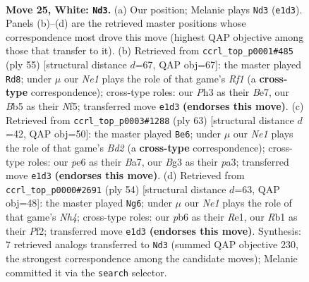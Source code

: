 \documentclass[11pt]{article}
\begin{document}
\clearpage

\begin{figure}[p]\centering
\begin{subfigure}{0.46\textwidth}\centering
\resizebox{\linewidth}{!}{%
\newchessgame
\chessboard[
  setfen={rnb3k1/5p2/1p2p3/1Bb4p/4r3/6BP/PpR2PK1/1R2N3 w - - 0 25},
  showmover=false,
  pgfstyle=straightmove, color=movearrow, markmove={e1-d3}
]}
\caption{}
\end{subfigure}\hfill
\begin{subfigure}{0.46\textwidth}\centering
\resizebox{\linewidth}{!}{%
\newchessgame
\chessboard[
  setfen={5rk1/p1r1b1pp/Rp6/5n2/4NP2/1PB2P2/1P5P/5R1K b - - 4 28},
  showmover=false,
  pgfstyle=straightmove, color=movearrow, markmove={f8-d8}
]}
\caption{}
\end{subfigure}
\\[4pt]
\begin{subfigure}{0.46\textwidth}\centering
\resizebox{\linewidth}{!}{%
\newchessgame
\chessboard[
  setfen={4r1k1/b1rb2pp/5p2/1p1R4/8/PP3P1P/R1N1B1P1/5K2 b - - 0 32},
  showmover=false,
  pgfstyle=straightmove, color=movearrow, markmove={d7-e6}
]}
\caption{}
\end{subfigure}\hfill
\begin{subfigure}{0.46\textwidth}\centering
\resizebox{\linewidth}{!}{%
\newchessgame
\chessboard[
  setfen={2k4r/1p3R2/p1p1p2p/2P4P/3r3N/1Pn4b/P3BP2/4R1K1 w - - 0 28},
  showmover=false,
  pgfstyle=straightmove, color=movearrow, markmove={h4-g6}
]}
\caption{}
\end{subfigure}
\caption{\textbf{Move 25, White: \texttt{Nd3}.} (a) Our position; Melanie plays \texttt{Nd3} (\texttt{e1d3}). Panels (b)--(d) are the retrieved master positions whose correspondence most drove this move (highest QAP objective among those that transfer to it). (b) Retrieved from \texttt{ccrl\_top\_p0001\#485} (ply 55) [structural distance $d$=67, QAP obj=67]: the master played \texttt{Rd8}; under $\mu$ our \emph{Ne1} plays the role of that game's \emph{Rf1} (a \textbf{cross-type} correspondence); cross-type roles: our \emph{P}h3 as their \emph{B}e7, our \emph{B}b5 as their \emph{N}f5; transferred move \texttt{e1d3} \textbf{(endorses this move)}. (c) Retrieved from \texttt{ccrl\_top\_p0003\#1288} (ply 63) [structural distance $d$=42, QAP obj=50]: the master played \texttt{Be6}; under $\mu$ our \emph{Ne1} plays the role of that game's \emph{Bd2} (a \textbf{cross-type} correspondence); cross-type roles: our \emph{p}e6 as their \emph{B}a7, our \emph{B}g3 as their \emph{p}a3; transferred move \texttt{e1d3} \textbf{(endorses this move)}. (d) Retrieved from \texttt{ccrl\_top\_p0000\#2691} (ply 54) [structural distance $d$=63, QAP obj=48]: the master played \texttt{Ng6}; under $\mu$ our \emph{Ne1} plays the role of that game's \emph{Nh4}; cross-type roles: our \emph{p}b6 as their \emph{R}e1, our \emph{R}b1 as their \emph{P}f2; transferred move \texttt{e1d3} \textbf{(endorses this move)}. Synthesis: 7 retrieved analogs transferred to \texttt{Nd3} (summed QAP objective 230, the strongest correspondence among the candidate moves); Melanie committed it via the \texttt{search} selector.}
\label{fig:thought-m48}
\end{figure}
\end{document}
